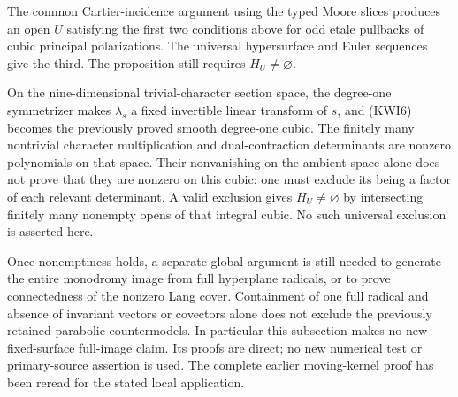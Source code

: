 \begin{remark}
\label{rem:Cartier-kernel-wall-inertia-scope}
The common Cartier-incidence argument using the typed Moore slices
produces an open \(U\) satisfying the first two conditions above
for odd etale pullbacks of cubic principal polarizations.  The
universal hypersurface and Euler sequences give the third.  The
proposition still requires \(H_U\ne\varnothing\).

On the nine-dimensional trivial-character section space, the
degree-one symmetrizer makes \(\lambda_s\) a fixed invertible
linear transform of \(s\), and (KWI6) becomes the previously
proved smooth degree-one cubic.  The finitely many nontrivial
character multiplication and dual-contraction determinants are
nonzero polynomials on that space.  Their nonvanishing on the
ambient space alone does not prove that they are nonzero on this
cubic: one must exclude its being a factor of each relevant
determinant.  A valid exclusion gives \(H_U\ne\varnothing\)
by intersecting finitely many nonempty opens of that integral
cubic.  No such universal exclusion is asserted here.

Once nonemptiness holds, a separate global argument is still needed
to generate the entire monodromy image from full hyperplane
radicals, or to prove connectedness of the nonzero Lang cover.
Containment of one full radical and absence of invariant vectors
or covectors alone does not exclude the previously retained
parabolic countermodels.  In particular this subsection makes no
new fixed-surface full-image claim.  Its proofs are direct; no new
numerical test or primary-source assertion is used.  The complete
earlier moving-kernel proof has been reread for the stated local
application.
\end{remark}
